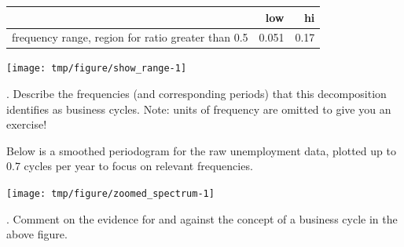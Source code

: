 \begin{frame}[fragile]





\begin{knitrout}\small
{}\color{fgcolor}
\begin{tabular}{l|r|r}
\hline
  & low & hi\\
\hline
frequency range, region for ratio greater than 0.5 & 0.051 & 0.17\\
\hline
\end{tabular}

\end{knitrout}

\begin{knitrout}\small
{}\color{fgcolor}

{\centering \texttt{[image: tmp/figure/show\_range-1]} 

}


\end{knitrout}

\myquestion. Describe the frequencies (and corresponding periods) that this decomposition identifies as business cycles. Note: units of frequency are omitted to give you an exercise!


\end{frame}

\begin{frame}[fragile]


Below is a smoothed periodogram for the raw unemployment data, plotted up to 0.7 cycles per year to focus on relevant frequencies.

\begin{knitrout}\small
{}\color{fgcolor}

{\centering \texttt{[image: tmp/figure/zoomed\_spectrum-1]} 

}


\end{knitrout}

\vspace{-1mm}

\myquestion. Comment on the evidence for and against the concept of a business cycle in the above figure.


\end{frame}

